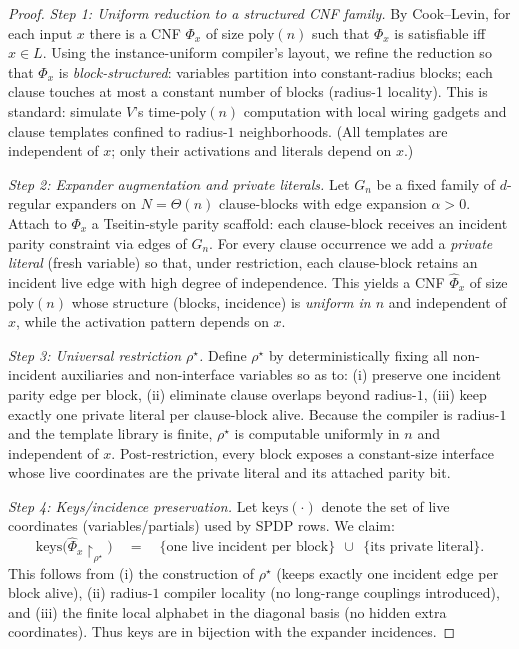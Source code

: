 \documentclass[12pt]{article}
\theoremstyle{definition}
\theoremstyle{definition}
\theoremstyle{remark}
\theoremstyle{remark}
\begin{document}
\begin{proof}
\emph{Step 1: Uniform reduction to a structured CNF family.}
By Cook--Levin, for each input $x$ there is a CNF $\Phi_x$ of size $\mathrm{poly}(n)$ such that
$\Phi_x$ is satisfiable iff $x\in L$. Using the instance-uniform compiler's layout,
we refine the reduction so that $\Phi_x$ is \emph{block-structured}:
variables partition into constant-radius blocks; each clause touches at most a constant number
of blocks (radius-1 locality). This is standard: simulate $V$'s time-$\mathrm{poly}(n)$
computation with local wiring gadgets and clause templates confined to radius-$1$ neighborhoods.
(All templates are independent of $x$; only their activations and literals depend on $x$.)

\emph{Step 2: Expander augmentation and private literals.}
Let $G_n$ be a fixed family of $d$-regular expanders on $N=\Theta(n)$ clause-blocks
with edge expansion $\alpha>0$. Attach to $\Phi_x$ a Tseitin-style parity scaffold:
each clause-block receives an incident parity constraint via edges of $G_n$.
For every clause occurrence we add a \emph{private literal} (fresh variable)
so that, under restriction, each clause-block retains an incident live edge with high degree of independence.
This yields a CNF $\widehat{\Phi}_x$ of size $\mathrm{poly}(n)$ whose structure (blocks, incidence)
is \emph{uniform in $n$} and independent of $x$, while the activation pattern depends on $x$.

\emph{Step 3: Universal restriction $\rho^\star$.}
Define $\rho^\star$ by deterministically fixing all non-incident auxiliaries and
non-interface variables so as to:
(i) preserve one incident parity edge per block,
(ii) eliminate clause overlaps beyond radius-$1$,
(iii) keep exactly one private literal per clause-block alive.
Because the compiler is radius-$1$ and the template library is finite,
$\rho^\star$ is computable uniformly in $n$ and independent of $x$.
Post-restriction, every block exposes a constant-size interface whose live coordinates are the
private literal and its attached parity bit.

\emph{Step 4: Keys/incidence preservation.}
Let $\mathrm{keys}(\cdot)$ denote the set of live coordinates (variables/partials) used by SPDP rows.
We claim:
\[
\mathrm{keys}\!\big(\widehat{\Phi}_x\!\upharpoonright_{\rho^\star}\big)
\quad=\quad
\{\text{one live incident per block}\}\ \ \cup\ \ \{\text{its private literal}\}.
\]
This follows from (i) the construction of $\rho^\star$ (keeps exactly one incident edge per block alive),
(ii) radius-$1$ compiler locality (no long-range couplings introduced), and
(iii) the finite local alphabet in the diagonal basis (no hidden extra coordinates).
Thus keys are in bijection with the expander incidences.


\end{proof}
\end{document}
